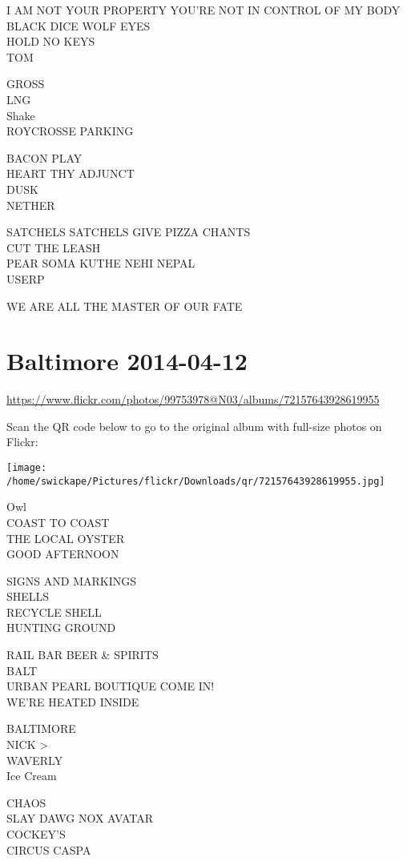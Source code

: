 \documentclass[10pt,letterpaper]{article}
\begin{document}
I AM NOT YOUR PROPERTY YOU'RE NOT IN CONTROL OF MY BODY\\
BLACK DICE WOLF EYES\\
HOLD NO KEYS\\
TOM

GROSS\\
LNG\\
Shake\\
ROYCROSSE PARKING

BACON PLAY\\
HEART THY ADJUNCT\\
DUSK\\
NETHER

SATCHELS SATCHELS GIVE PIZZA CHANTS\\
CUT THE LEASH\\
PEAR SOMA KUTHE NEHI NEPAL\\
USERP

WE ARE ALL THE MASTER OF OUR FATE


\section*{Baltimore 2014-04-12}

\url{https://www.flickr.com/photos/99753978@N03/albums/72157643928619955}

Scan the QR code below to go to the original album with full-size photos on Flickr:

\texttt{[image: /home/swickape/Pictures/flickr/Downloads/qr/72157643928619955.jpg]}


Owl\\
COAST TO COAST\\
THE LOCAL OYSTER\\
GOOD AFTERNOON

SIGNS AND MARKINGS\\
SHELLS\\
RECYCLE SHELL\\
HUNTING GROUND

RAIL BAR BEER \& SPIRITS\\
BALT\\
URBAN PEARL BOUTIQUE COME IN!\\
WE'RE HEATED INSIDE

BALTIMORE\\
NICK >\\
WAVERLY\\
Ice Cream

CHAOS\\
SLAY DAWG NOX AVATAR\\
COCKEY'S\\
CIRCUS CASPA
\end{document}
